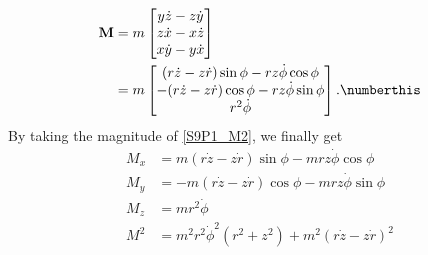\begin{problem}[title={Angular momentum in cylindrical co-ordinates}]
{\begin{align*}
    \mathbf{M} &= m \begin{bmatrix} y \Dot{z} - z \Dot{y} \\ z \Dot{x} - x \Dot{z} \\ x \Dot{y} - y \Dot{x} \end{bmatrix} \\
    &= m \begin{bmatrix} (r\Dot{z} - z\Dot{r})\sin{\phi} - rz\Dot{\phi}\cos{\phi} \\ -(r\Dot{z} - z\Dot{r})\cos{\phi} - rz\Dot{\phi}\sin{\phi} \\ r^2\Dot{\phi} \end{bmatrix} . \numberthis \label{S9P1_M2}
\end{align*}
By taking the magnitude of \eqref{S9P1_M2}, we finally get
}
{
\begin{align*}
    M_x &= m(r\Dot{z} - z\Dot{r})\sin{\phi} - mrz\Dot{\phi}\cos{\phi} \\
    M_y &= -m(r\Dot{z} - z\Dot{r})\cos{\phi} - mrz\Dot{\phi}\sin{\phi} \\
    M_z &= mr^2\Dot{\phi} \\
    M^2 &= m^2r^2\Dot{\phi}^2(r^2 + z^2) + m^2(r\Dot{z} - z\Dot{r})^2
\end{align*}
}
\end{problem}


